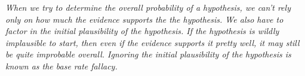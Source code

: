 \documentclass[10pt]{article}
\begin{document}
\textit{When we try to determine the overall probability of a hypothesis, we can't rely only on how much the evidence supports the the hypothesis.  We also have to factor in the initial plausibility of the hypothesis.  If the hypothesis is wildly implausible to start, then even if the evidence supports it pretty well, it may still be quite improbable overall. Ignoring the initial plausibility of the hypothesis is known as the base rate fallacy.}
\end{document}
